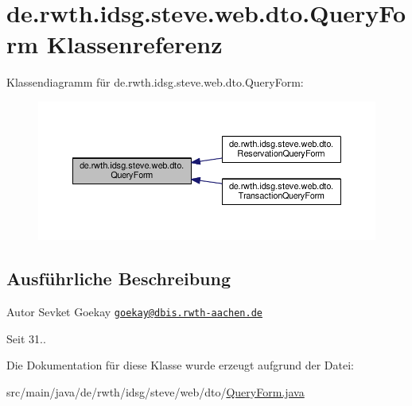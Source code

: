 \hypertarget{classde_1_1rwth_1_1idsg_1_1steve_1_1web_1_1dto_1_1_query_form}{\section{de.\+rwth.\+idsg.\+steve.\+web.\+dto.\+Query\+Form Klassenreferenz}
\label{classde_1_1rwth_1_1idsg_1_1steve_1_1web_1_1dto_1_1_query_form}
}


Klassendiagramm für de.\+rwth.\+idsg.\+steve.\+web.\+dto.\+Query\+Form\+:\nopagebreak
\begin{figure}[H]
\begin{center}
\leavevmode
\includegraphics[width=350pt]{classde_1_1rwth_1_1idsg_1_1steve_1_1web_1_1dto_1_1_query_form__inherit__graph}
\end{center}
\end{figure}


\subsection{Ausführliche Beschreibung}
\begin{DoxyAuthor}{Autor}
Sevket Goekay \href{mailto:goekay@dbis.rwth-aachen.de}{\tt goekay@dbis.\+rwth-\/aachen.\+de} 
\end{DoxyAuthor}
\begin{DoxySince}{Seit}
31.. 
\end{DoxySince}


Die Dokumentation für diese Klasse wurde erzeugt aufgrund der Datei\+:\begin{DoxyCompactItemize}
\item 
src/main/java/de/rwth/idsg/steve/web/dto/\hyperlink{_query_form_8java}{Query\+Form.\+java}\end{DoxyCompactItemize}
